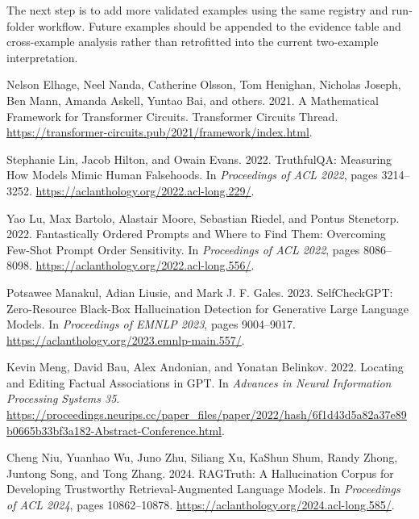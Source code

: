 \documentclass[11pt]{article}
\begin{document}
The next step is to add more validated examples using the same registry and run-folder workflow. Future examples should be appended to the evidence table and cross-example analysis rather than retrofitted into the current two-example interpretation.

\clearpage
\onecolumn
\begin{thebibliography}{}

Nelson Elhage, Neel Nanda, Catherine Olsson, Tom Henighan, Nicholas Joseph, Ben Mann, Amanda Askell, Yuntao Bai, and others.
2021.
\newblock A Mathematical Framework for Transformer Circuits.
\newblock Transformer Circuits Thread.
\newblock \url{https://transformer-circuits.pub/2021/framework/index.html}.

Stephanie Lin, Jacob Hilton, and Owain Evans. 2022.
\newblock TruthfulQA: Measuring How Models Mimic Human Falsehoods.
\newblock In \emph{Proceedings of ACL 2022}, pages 3214--3252.
\newblock \url{https://aclanthology.org/2022.acl-long.229/}.

Yao Lu, Max Bartolo, Alastair Moore, Sebastian Riedel, and Pontus Stenetorp.
2022.
\newblock Fantastically Ordered Prompts and Where to Find Them: Overcoming Few-Shot Prompt Order Sensitivity.
\newblock In \emph{Proceedings of ACL 2022}, pages 8086--8098.
\newblock \url{https://aclanthology.org/2022.acl-long.556/}.

Potsawee Manakul, Adian Liusie, and Mark J. F. Gales.
2023.
\newblock SelfCheckGPT: Zero-Resource Black-Box Hallucination Detection for Generative Large Language Models.
\newblock In \emph{Proceedings of EMNLP 2023}, pages 9004--9017.
\newblock \url{https://aclanthology.org/2023.emnlp-main.557/}.

Kevin Meng, David Bau, Alex Andonian, and Yonatan Belinkov.
2022.
\newblock Locating and Editing Factual Associations in GPT.
\newblock In \emph{Advances in Neural Information Processing Systems 35}.
\newblock \url{https://proceedings.neurips.cc/paper_files/paper/2022/hash/6f1d43d5a82a37e89b0665b33bf3a182-Abstract-Conference.html}.

Cheng Niu, Yuanhao Wu, Juno Zhu, Siliang Xu, KaShun Shum, Randy Zhong, Juntong Song, and Tong Zhang.
2024.
\newblock RAGTruth: A Hallucination Corpus for Developing Trustworthy Retrieval-Augmented Language Models.
\newblock In \emph{Proceedings of ACL 2024}, pages 10862--10878.
\newblock \url{https://aclanthology.org/2024.acl-long.585/}.


\end{thebibliography}
\end{document}
